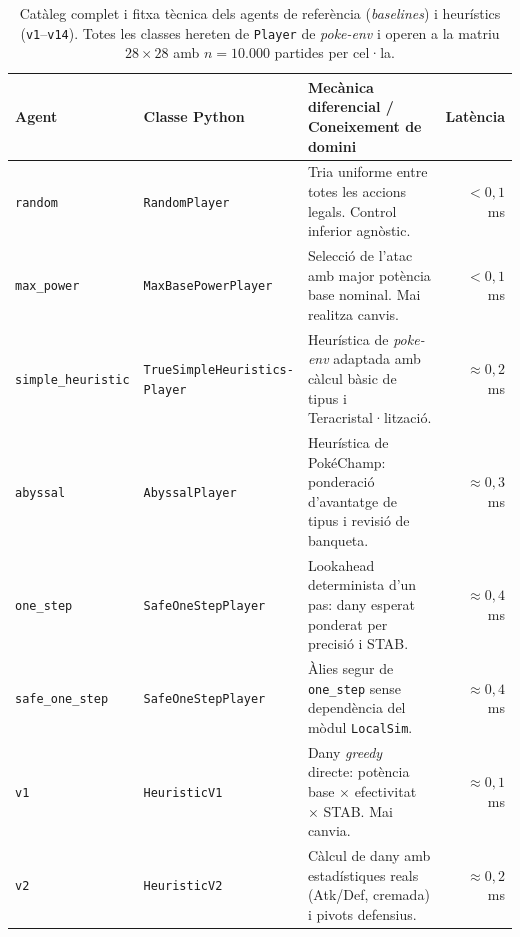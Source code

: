 \begin{table}[htbp]
\centering
\caption{Catàleg complet i fitxa tècnica dels agents de referència (\emph{baselines}) i heurístics (\texttt{v1}--\texttt{v14}). Totes les classes hereten de \texttt{Player} de \textit{poke-env} i operen a la matriu $28\times 28$ amb $n=10.000$ partides per cel·la.}
\label{tab:app_agents_heuristics}
\footnotesize
\renewcommand{\arraystretch}{1.15}
\begin{tabularx}{\textwidth}{lp{4.0cm}>{\raggedright\arraybackslash}X r}
\toprule
\textbf{Agent} & \textbf{Classe Python} & \textbf{Mecànica diferencial / Coneixement de domini} & \textbf{Latència} \\
\midrule
\texttt{random} & \texttt{RandomPlayer} & Tria uniforme entre totes les accions legals. Control inferior agnòstic. & $<0{,}1$~ms \\
\arrayrulecolor{gray!30}\hline\arrayrulecolor{black}
\texttt{max\_power} & \texttt{MaxBasePowerPlayer} & Selecció de l'atac amb major potència base nominal. Mai realitza canvis. & $<0{,}1$~ms \\
\arrayrulecolor{gray!30}\hline\arrayrulecolor{black}
\texttt{simple\_heuristic} & \texttt{TrueSimpleHeuristics-}\newline\texttt{Player} & Heurística de \textit{poke-env} adaptada amb càlcul bàsic de tipus i Teracristal·lització. & $\approx 0{,}2$~ms \\
\arrayrulecolor{gray!30}\hline\arrayrulecolor{black}
\texttt{abyssal} & \texttt{AbyssalPlayer} & Heurística de PokéChamp: ponderació d'avantatge de tipus i revisió de banqueta. & $\approx 0{,}3$~ms \\
\arrayrulecolor{gray!30}\hline\arrayrulecolor{black}
\texttt{one\_step} & \texttt{SafeOneStepPlayer} & Lookahead determinista d'un pas: dany esperat ponderat per precisió i STAB. & $\approx 0{,}4$~ms \\
\arrayrulecolor{gray!30}\hline\arrayrulecolor{black}
\texttt{safe\_one\_step} & \texttt{SafeOneStepPlayer} & Àlies segur de \texttt{one\_step} sense dependència del mòdul \texttt{LocalSim}. & $\approx 0{,}4$~ms \\
\arrayrulecolor{gray!30}\hline\arrayrulecolor{black}
\texttt{v1} & \texttt{HeuristicV1} & Dany \textit{greedy} directe: potència base $\times$ efectivitat $\times$ STAB. Mai canvia. & $\approx 0{,}1$~ms \\
\arrayrulecolor{gray!30}\hline\arrayrulecolor{black}
\texttt{v2} & \texttt{HeuristicV2} & Càlcul de dany amb estadístiques reals (Atk/Def, cremada) i pivots defensius. & $\approx 0{,}2$~ms \\

\end{tabularx}
\end{table}
